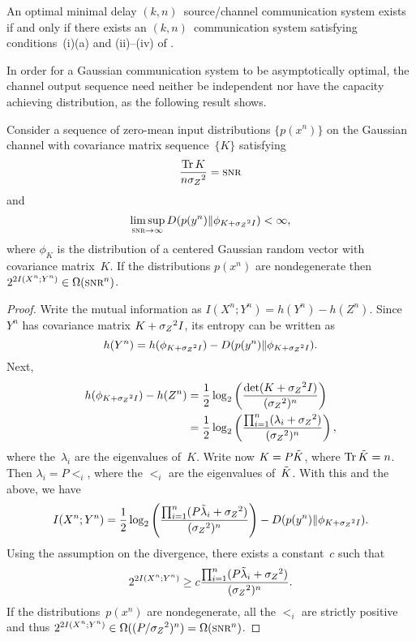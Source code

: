 \begin{lemma}
  \label{lem:optcodenkexist}
  An optimal minimal delay $(k,n)$~source/channel communication system exists if
  and only if there exists an $(k,n)$~communication system satisfying
  conditions~(i)(a) and (ii)--(iv) of .
\end{lemma}

In order for a Gaussian communication system to be asymptotically optimal, the
channel output sequence need neither be independent nor have the capacity
achieving distribution, as the following result shows. 

\begin{lemma}
  \label{lem:asymptoptinputs}
  Consider a sequence of zero-mean input distributions $\{p(x^n)\}$ on the
  Gaussian channel with covariance matrix sequence~$\{K\}$ satisfying
  \begin{equation*}
    \frac{\Tr K}{n \szq} = \snr
  \end{equation*}
  and 
  \begin{equation*}
    \limsup_{\snr \goesto \infty} D(p(y^n) \| \phi_{K + \szq I}) < \infty,
  \end{equation*}
  where $\phi_K$ is the distribution of a centered Gaussian random vector with
  covariance matrix~$K$. If the distributions $p(x^n)$ are nondegenerate then
  $2^{2 I(X^n; Y^n)} \in \Omega(\snr^n)$. 
\end{lemma}

\begin{proof}
  Write the mutual information as $I(X^n; Y^n) = h(Y^n) - h(Z^n)$. Since $Y^n$
  has covariance matrix $K + {{\sigma_Z}^2} I$, its entropy can be written
  as~\cite[Theorem~8.6.5]{CoverT1991}
  \begin{equation*}
    h(Y^n) = h(\phi_{K + {{\sigma_Z}^2} I}) - D(p(y^n) \| \phi_{K + {{\sigma_Z}^2} I}).
  \end{equation*}
  Next, 
  \begin{align*}
    h(\phi_{K + {{\sigma_Z}^2} I}) - h(Z^n) &= \frac12 \log_2 \left(
    \frac{\det(K + {{\sigma_Z}^2} I)}{({{\sigma_Z}^2})^n} \right) \\
    &= \frac12 \log_2 \left( \frac{{\prod_{i=1}^n} (\lambda_i + {{\sigma_Z}^2})}{({{\sigma_Z}^2})^n} \right),
  \end{align*}
  where the~$\lambda_i$ are the eigenvalues of~$K$. Write now $K = P \tilde{K}$, where
  $\operatorname{Tr} \tilde{K} = n$. Then $\lambda_i = P \lt_i$, where the $\lt_i$ are the
  eigenvalues of~$\tilde{K}$. With this and the above, we have
  \begin{equation*}
    I(X^n; Y^n) = \frac12 \log_2 \left(
    \frac{ {\prod_{i=1}^n}(P \tilde{\lambda}_i + {{\sigma_Z}^2})}{({{\sigma_Z}^2})^n} \right) - D(p(y^n) \| \phi_{K + {{\sigma_Z}^2}
    I}).
  \end{equation*}
  Using the assumption on the divergence, there exists a constant~$c$ such that
  \begin{equation*}
    2^{2 I(X^n; Y^n)} \ge c \frac{ {\prod_{i=1}^n}(P \tilde{\lambda}_i + {{\sigma_Z}^2})}{({{\sigma_Z}^2})^n}.
  \end{equation*}
  If the distributions~$p(x^n)$ are nondegenerate, all the $\lt_i$ are strictly
  positive and thus $2^{2 I(X^n; Y^n)} \in \Omega((P/\szq)^n) = \Omega(\snr^n)$.
\end{proof}

